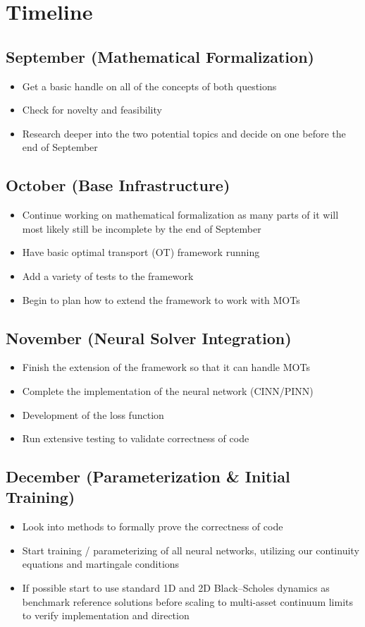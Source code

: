 \documentclass[11pt]{article}
\begin{document}
\section*{Timeline}

\subsection*{September (Mathematical Formalization)}
\begin{itemize}
  \item Get a basic handle on all of the concepts of both questions
  \item Check for novelty and feasibility
  \item Research deeper into the two potential topics and decide on one before the end of September
\end{itemize}

\subsection*{October (Base Infrastructure)}
\begin{itemize}
  \item Continue working on mathematical formalization as many parts of it will most likely still be incomplete by the end of September
  \item Have basic optimal transport (OT) framework running
  \item Add a variety of tests to the framework
  \item Begin to plan how to extend the framework to work with MOTs
\end{itemize}

\subsection*{November (Neural Solver Integration)}
\begin{itemize}
  \item Finish the extension of the framework so that it can handle MOTs
  \item Complete the implementation of the neural network (CINN/PINN)
  \item Development of the loss function
  \item Run extensive testing to validate correctness of code
\end{itemize}

\subsection*{December (Parameterization \& Initial Training)}
\begin{itemize}
  \item Look into methods to formally prove the correctness of code
  \item Start training / parameterizing of all neural networks, utilizing our continuity equations and martingale conditions
  \item If possible start to use standard 1D and 2D Black--Scholes dynamics as benchmark reference solutions before scaling to multi-asset continuum limits to verify implementation and direction
\end{itemize}
\end{document}
